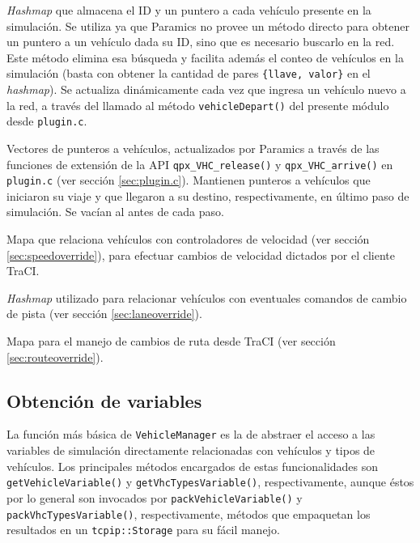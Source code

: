 \begin{description}[]
    \item[\texttt{vehicles\_in\_sim}] \emph{Hashmap} que almacena el ID y un puntero a cada vehículo presente en la simulación. Se utiliza ya que Paramics no provee un método directo para obtener un puntero a un vehículo dada su ID, sino que es necesario buscarlo en la red. Este método elimina esa búsqueda y facilita además el conteo de vehículos en la simulación (basta con obtener la cantidad de pares \texttt{\{llave, valor\}} en el \emph{hashmap}). Se actualiza dinámicamente cada vez que ingresa un vehículo nuevo a la red, a través del llamado al método \texttt{vehicleDepart()} del presente módulo desde \texttt{plugin.c}.
    
    \item[\texttt{departed\_vehicles} y \texttt{arrived\_vehicles}] Vectores de punteros a vehículos, actualizados por Paramics a través de las funciones de extensión de la API \texttt{qpx\_VHC\_release()} y \texttt{qpx\_VHC\_arrive()} en \texttt{plugin.c} (ver sección \ref{sec:plugin.c}). Mantienen punteros a vehículos que iniciaron su viaje y que llegaron a su destino, respectivamente, en último paso de simulación. Se vacían al antes de cada paso.
    
    \item[\texttt{speed\_controllers}] Mapa que relaciona vehículos con controladores de velocidad (ver sección \ref{sec:speedoverride}), para efectuar cambios de velocidad dictados por el cliente TraCI.
    
    \item[\texttt{lane\_set\_triggers}] \emph{Hashmap} utilizado para relacionar vehículos con eventuales comandos de cambio de pista (ver sección \ref{sec:laneoverride}).
    
    \item [\texttt{vhc\_routes}] Mapa para el manejo de cambios de ruta desde TraCI (ver sección \ref{sec:routeoverride}).
\end{description}

\subsection{Obtención de variables}

La función más básica de \texttt{VehicleManager} es la de abstraer el acceso a las variables de simulación directamente relacionadas con vehículos y tipos de vehículos. Los principales métodos encargados de estas funcionalidades son \texttt{getVehicleVariable()} y \texttt{getVhcTypesVariable()}, respectivamente, aunque éstos por lo general son invocados por \texttt{packVehicleVariable()} y \texttt{packVhcTypesVariable()}, respectivamente, métodos que empaquetan los resultados en un \texttt{tcpip::Storage} para su fácil manejo.